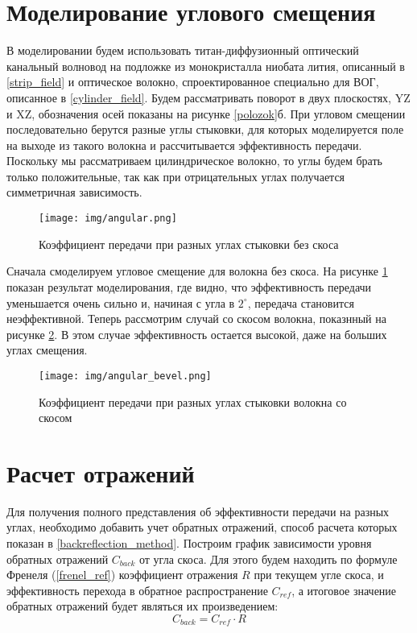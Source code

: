 \section{Моделирование углового смещения}

В моделировании будем использовать титан-диффузионный оптический канальный волновод на подложке из монокристалла ниобата лития, описанный в \ref{strip_field} и оптическое волокно, спроектированное специально для ВОГ, описанное в \ref{cylinder_field}. Будем рассматривать поворот в двух плоскостях, YZ и XZ, обозначения осей показаны на рисунке \ref{polozok}б. При угловом смещении последовательно берутся разные углы стыковки, для которых моделируется поле на выходе из такого волокна и рассчитывается эффективность передачи. Поскольку мы рассматриваем цилиндрическое волокно, то углы будем брать только положительные, так как при отрицательных углах получается симметричная зависимость.

\begin{figure}[h!]
	\texttt{[image: img/angular.png]}
	\caption{Коэффициент передачи при разных углах стыковки без скоса}
	\label{angular}
\end{figure}

Сначала смоделируем угловое смещение для волокна без скоса. На рисунке \ref{angular} показан результат моделирования, где видно, что эффективность передачи уменьшается очень сильно и, начиная с угла в $2^\circ$, передача становится неэффективной. Теперь рассмотрим случай со скосом волокна, показнный на рисунке \ref{angular_bevel}. В этом случае эффективность остается высокой, даже на больших углах смещения.

\begin{figure}[h!]
	\texttt{[image: img/angular\_bevel.png]}
	\caption{Коэффициент передачи при разных углах стыковки волокна со скосом}
	\label{angular_bevel}
\end{figure}

\section{Расчет отражений}
Для получения полного представления об эффективности передачи на разных углах, необходимо добавить учет обратных отражений, способ расчета которых показан в \ref{backreflection_method}. Построим график зависимости уровня обратных отражений $C_{back}$ от угла скоса. Для этого будем находить по формуле Френеля (\ref{frenel_ref}) коэффициент отражения $R$ при текущем угле скоса, и эффективность перехода в обратное распространение $C_{ref}$, а итоговое значение обратных отражений будет являться их произведением:
\begin{equation}
	C_{back} = C_{ref} \cdot R
\end{equation}

